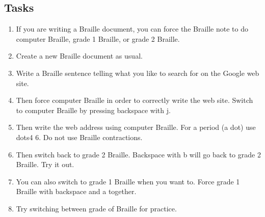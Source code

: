 \documentclass[10pt,letterpaper,twoside]{report}
\begin{document}
{{{ \subsection{Tasks}
\begin{enumerate}
	\item If you are writing a Braille document, you can force the Braille note to do computer Braille, grade 1 Braille, or grade 2 Braille.
	\item Create a new Braille document as usual.
	\item Write a Braille sentence telling what you like to search for on the Google web site.
	\item Then force computer Braille in order to correctly write the web site.  Switch to computer Braille by pressing backspace with j.
	\item Then write the web address using computer Braille.  For a period (a dot) use dots4 6.  Do not use Braille contractions.
	\item Then switch back to grade 2 Braille.  Backspace with b will go back to grade 2 Braille.  Try it out.
	\item You can also switch to grade 1 Braille when you want to.  Force grade 1 Braille with backspace and a together.
	\item Try switching between grade of Braille for practice.
\end{enumerate}
\clearpage

}}}
\end{document}
